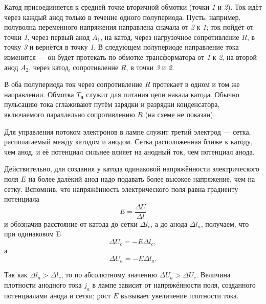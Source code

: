 \documentclass[a4paper,10pt]{book}
\begin{document}
Катод присоединяется к средней точке вторичной обмотки (точки \textit{1} и \textit{2}). Ток идёт через каждый анод только в течение одного полупериода. Пусть, например, полуволна переменного напряжения направлена сначала от \textit{2} к \textit{1}; ток пойдёт от точки \textit{1}, через первый анод $A_1$, на катод, через нагрузочное сопротивление $R$, в точку \textit{3} и вернётся в точку \textit{1}. В следующем полупериоде направление тока изменится — он будет протекать по обмотке трансформатора от \textit{1} к \textit{2}, на второй анод $A_2$, через катод, сопротивление $R$, в точки \textit{3} и \textit{2}.

В оба полупериода ток через сопротивление $R$ протекает в одном и том же направлении. Обмотка $T_\text{н}$ служит для питания цепи накала катода. Обычно пульсацию тока сглаживают путём зарядки и разрядки конденсатора, включаемого параллельно сопротивлению $R$ (на схеме не показан).

Для управления потоком электронов в лампе служит третий электрод — сетка, располагаемый между катодом и анодом. Сетка расположенная ближе к катоду, чем анод, и её потенциал сильнее влияет на анодный ток, чем потенциал анода.

Действительно, для создания у катода одинаковой напряжённости электрического поля $E$ на более далёкий анод надо подавать более высокое напряжение, чем на сетку. Вспомнив, что напряжённость электрического поля равна градиенту потенциала\begin{equation}
E = \frac{\Delta U}{\Delta l}\nonumber
\end{equation} и обозначив расстояние от катода до сетки $\Delta l_c$, а до анода $\Delta l_a$, получаем, что при одинаковом E\begin{equation}
\Delta U_c = -E\Delta l_c,\nonumber
\end{equation} а \begin{equation}
\Delta U_a = -E\Delta l_a.\nonumber
\end{equation}

Так как $\Delta l_a>\Delta l_c$, то по абсолютному значению $\Delta U_a>\Delta U_c$. Величина плотности анодного тока $j_a$ в лампе зависит от напряжённости поля, созданного потенциалами анода и сетки; рост $E$ вызывает увеличение плотности тока.
\end{document}
